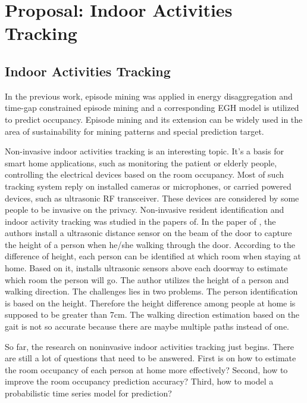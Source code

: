 \chapter{Proposal: Indoor Activities Tracking}

\section{Indoor Activities Tracking}
In the previous work, 
episode mining was applied in energy disaggregation and 
time-gap constrained episode mining and a corresponding EGH model is utilized 
to predict occupancy. 
Episode mining and its extension can be widely used in the area of
sustainability for mining patterns and special prediction target.  

Non-invasive indoor activities tracking is an interesting topic. 
It's a basis for smart home applications, 
such as monitoring the patient or elderly people, 
controlling the electrical devices based on the room occupancy. 
Most of such tracking system reply on installed cameras or microphones, 
or carried powered devices, such as ultrasonic RF transceiver. 
These devices are considered by some people to be invasive on the privacy. 
Non-invasive resident identification and indoor activity tracking was 
studied in the papers of\cite{srinivasan2010using, hnat2012doorjamb}. 
In the paper of \cite{srinivasan2010using}, 
the authors
install a ultrasonic distance sensor on the 
beam of the door to capture the height of a person 
when he/she walking through the door. 
According to the difference of height, 
each person can be identified at which room 
when staying at home. 
Based on it, \cite{hnat2012doorjamb} installs 
ultrasonic sensors above each doorway to 
estimate which room the person will go. 
The author utilizes the height of a person and walking direction. 
The challenges lies in two problems. 
The person identification is based on the height. 
Therefore the height difference among people at home 
is supposed to be greater than 7cm. 
The walking direction estimation based on the gait is 
not so accurate because there are maybe 
multiple paths instead of one. 

So far, the research on noninvasive indoor activities tracking just begins. 
There are still a lot of questions that need to be answered.
First is on how to estimate the room occupancy of each person at home more effectively?
Second, how to improve the room occupancy prediction accuracy?
Third, how to model a probabilistic time series model for prediction?

